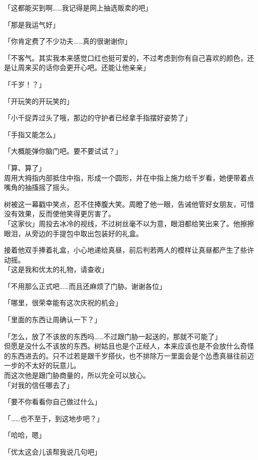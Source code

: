 「这都能买到啊……我记得是网上抽选贩卖的吧」

「那是我运气好」

「你肯定费了不少功夫……真的很谢谢你」

「不客气。其实我本来感觉口红也挺可爱的，不过考虑到你有自己喜欢的颜色，还是让周来买的话你会更开心吧。还能让他亲亲」

「千岁！？」

「开玩笑的开玩笑的」

「小千捉弄过头了哦，那边的守护者已经拿手指摆好姿势了」

「手指又能怎么」

「大概能弹你脑门吧。要不要试试？」

「算、算了」\\

周用大拇指内部抵住中指，形成一个圆形，并在中指上施力给千岁看，她便带着点嘴角的抽搐摇了摇头。

树被这一幕戳中笑点，忍不住捧腹大笑。周瞪了他一眼，告诫他管好女朋友，可惜没有效果，反而使他笑得更厉害了。\\

「这家伙」周投去冰冷的视线，不过树丝毫不以为意，眼泪都给笑出来了。他擦擦眼泪，从旁边的手提包中取出包装好的礼盒。

接着他双手捧着礼盒，小心地递给真昼，前后判若两人的模样让真昼都产生了些许动摇。\\

「这是我和优太的礼物，请查收」

「不用那么正式吧……而且还麻烦了门胁。谢谢各位」

「哪里，很荣幸能有这次庆祝的机会」

「里面的东西让周确认一下？」

「怎么，放了不该放的东西吗……不过跟门胁一起送的，那就不可能了」\\

但愿是没什么不该放的东西。树姑且也是个正经人，本来应该也是不会放什么奇怪的东西进去的。只不过若是跟千岁搭伙，也不排除万一里面会是个怂恿真昼往前迈一步的不太好的玩意儿。\\

而这次他是跟门胁商量的，所以完全可以放心。\\

「对我的信任哪去了」

「要不你看看你自己做过什么」

「……也不至于，到这地步吧？」

「哈哈，嗯」

「优太这会儿该帮我说几句吧」


